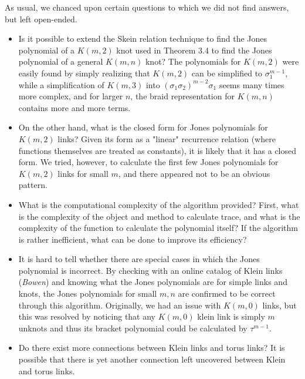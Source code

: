 \documentclass[12pt]{article}
\begin{document}
As usual, we chanced upon certain questions to which we did not find answers, but left open-ended. 

\begin{itemize}

\item Is it possible to extend the Skein relation technique to find the Jones polynomial of a $K(m, 2)$ knot used in Theorem 3.4 to find the Jones polynomial of a general $K(m, n)$ knot? The polynomials for $K(m, 2)$ were easily found by simply realizing that $K(m, 2)$ can be simplified to $\sigma_1^{m - 1}$, while a simplification of $K(m, 3)$ into $(\sigma_1 \sigma_2)^{m - 2} \sigma_1$ seems many times more complex, and for larger $n$, the braid representation for $K(m, n)$ contains more and more terms. 

\item On the other hand, what is the closed form for Jones polynomials for $K(m, 2)$ links? Given its form as a "linear" recurrence relation (where functions themselves are treated as constants), it is likely that it has a closed form. We tried, however, to calculate the first few Jones polynomials for $K(m, 2)$ links for small $m$, and there appeared not to be an obvious pattern. 

\item What is the computational complexity of the algorithm provided? First, what is the complexity of the object and method to calculate trace, and what is the complexity of the function to calculate the polynomial itself? If the algorithm is rather inefficient, what can be done to improve its efficiency? 

\item It is hard to tell whether there are special cases in which the Jones polynomial is incorrect. By checking with an online catalog of Klein links (\textit{Bowen}) and knowing what the Jones polynomials are for simple links and knots, the Jones polynomials for small $m, n$ are confirmed to be correct through this algorithm. Originally, we had an issue with $K(m, 0)$ links, but this was resolved by noticing that any $K(m, 0)$ klein link is simply $m$ unknots and thus its bracket polynomial could be calculated by $\tau^{m - 1}$. 

\item Do there exist more connections between Klein links and torus links? It is possible that there is yet another connection left uncovered between Klein and torus links. 

\end{itemize}
\end{document}
